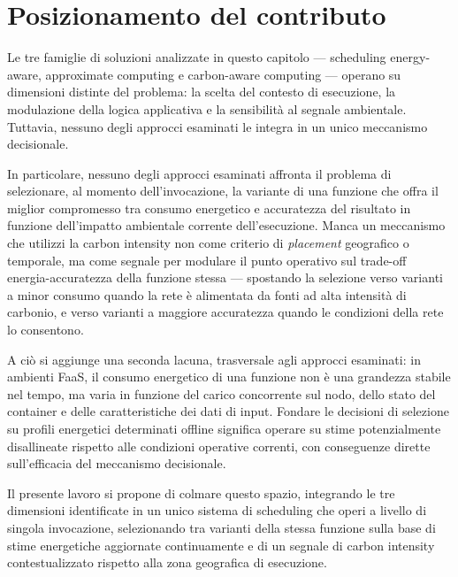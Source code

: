\section{Posizionamento del contributo}
\label{sec:posizionamento}

Le tre famiglie di soluzioni analizzate in questo capitolo ---
scheduling energy-aware, approximate computing e carbon-aware computing
--- operano su dimensioni distinte del problema: la scelta del contesto
di esecuzione, la modulazione della logica applicativa e la sensibilità
al segnale ambientale. Tuttavia, nessuno degli approcci esaminati le
integra in un unico meccanismo decisionale.

In particolare, nessuno degli approcci esaminati affronta il problema
di selezionare, al momento dell'invocazione, la variante di una
funzione che offra il miglior compromesso tra consumo energetico e
accuratezza del risultato in funzione dell'impatto ambientale corrente
dell'esecuzione. Manca un meccanismo che utilizzi la carbon intensity
non come criterio di \emph{placement} geografico o temporale, ma come
segnale per modulare il punto operativo sul trade-off
energia-accuratezza della funzione stessa --- spostando la selezione
verso varianti a minor consumo quando la rete è alimentata da fonti ad
alta intensità di carbonio, e verso varianti a maggiore accuratezza
quando le condizioni della rete lo consentono.

A ciò si aggiunge una seconda lacuna, trasversale agli approcci
esaminati: in ambienti FaaS, il consumo energetico di una funzione non
è una grandezza stabile nel tempo, ma varia in funzione del carico
concorrente sul nodo, dello stato del container e delle caratteristiche
dei dati di input. Fondare le decisioni di selezione su profili
energetici determinati offline significa operare su stime
potenzialmente disallineate rispetto alle condizioni operative correnti,
con conseguenze dirette sull'efficacia del meccanismo decisionale.

Il presente lavoro si propone di colmare questo spazio, integrando le
tre dimensioni identificate in un unico sistema di scheduling che
operi a livello di singola invocazione, selezionando tra varianti della
stessa funzione sulla base di stime energetiche aggiornate
continuamente e di un segnale di carbon intensity contestualizzato
rispetto alla zona geografica di esecuzione.